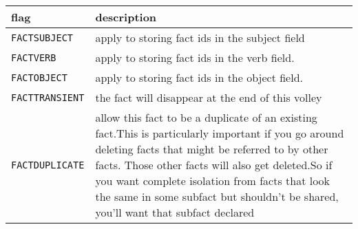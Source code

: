 \documentclass[]{article}
\begin{document}
\begin{longtable}[]{@{}ll@{}}
\toprule
\begin{minipage}[b]{0.21\columnwidth}\raggedright\strut
flag\strut
\end{minipage} & \begin{minipage}[b]{0.61\columnwidth}\raggedright\strut
description\strut
\end{minipage}\tabularnewline
\midrule
\endhead
\begin{minipage}[t]{0.21\columnwidth}\raggedright\strut
\texttt{FACTSUBJECT}\strut
\end{minipage} & \begin{minipage}[t]{0.61\columnwidth}\raggedright\strut
apply to storing fact ids in the subject field\strut
\end{minipage}\tabularnewline
\begin{minipage}[t]{0.21\columnwidth}\raggedright\strut
\texttt{FACTVERB}\strut
\end{minipage} & \begin{minipage}[t]{0.61\columnwidth}\raggedright\strut
apply to storing fact ids in the verb field.\strut
\end{minipage}\tabularnewline
\begin{minipage}[t]{0.21\columnwidth}\raggedright\strut
\texttt{FACTOBJECT}\strut
\end{minipage} & \begin{minipage}[t]{0.61\columnwidth}\raggedright\strut
apply to storing fact ids in the object field.\strut
\end{minipage}\tabularnewline
\begin{minipage}[t]{0.21\columnwidth}\raggedright\strut
\texttt{FACTTRANSIENT}\strut
\end{minipage} & \begin{minipage}[t]{0.61\columnwidth}\raggedright\strut
the fact will disappear at the end of this volley\strut
\end{minipage}\tabularnewline
\begin{minipage}[t]{0.21\columnwidth}\raggedright\strut
\texttt{FACTDUPLICATE}\strut
\end{minipage} & \begin{minipage}[t]{0.61\columnwidth}\raggedright\strut
allow this fact to be a duplicate of an existing fact.This is
particularly important if you go around deleting facts that might be
referred to by other facts. Those other facts will also get deleted.So
if you want complete isolation from facts that look the same in some
subfact but shouldn't be shared, you'll want that subfact declared

\end{minipage}
\end{longtable}
\end{document}
